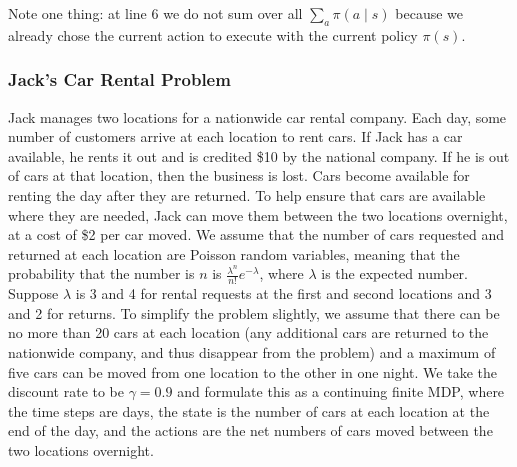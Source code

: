 Note one thing: at line 6 we do not sum over all $\sum_a \pi(a \mid s)$ because we already chose the current action to execute with the current policy $\pi(s)$.

\subsubsection{Jack's Car Rental Problem}
Jack manages two locations for a nationwide car rental company. Each day, some number of customers arrive at each location to rent cars. If Jack has a car available, he rents it out and is credited \$10 by the national company. If he is out of cars at that location, then the business is lost. Cars become available for renting the day after they are returned. To help ensure that cars are available where they are needed, Jack can move them between the two locations overnight, at a cost of \$2 per car moved. We assume that the number of cars requested and returned at each location are Poisson random variables, meaning that the probability that the number is $n$ is $\frac{\lambda^n}{n!} e^{-\lambda}$, where $\lambda$ is the expected number. Suppose $\lambda$ is 3 and 4 for rental requests at the first and second locations and 3 and 2 for returns. To simplify the problem slightly, we assume that there can be no more than 20 cars at each location (any additional cars are returned to the nationwide company, and thus disappear from the problem) and a maximum of five cars can be moved from one location to the other in one night. We take the discount rate to be $\gamma = 0.9$ and formulate this as a continuing finite MDP, where the time steps are days, the state is the number of cars at each location at the end of the day, and the actions are the net numbers of cars moved between the two locations overnight.

